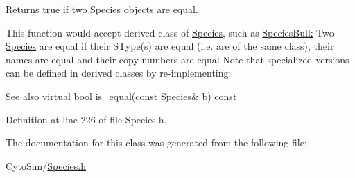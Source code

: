Returns true if two \hyperlink{classchem_1_1Species}{Species} objects are equal. 

This function would accept derived class of \hyperlink{classchem_1_1Species}{Species}, such as \hyperlink{classchem_1_1SpeciesBulk}{Species\-Bulk} Two \hyperlink{classchem_1_1Species}{Species} are equal if their S\-Type(s) are equal (i.\-e. are of the same class), their names are equal and their copy numbers are equal Note that specialized versions can be defined in derived classes by re-\/implementing\-: \begin{DoxySeeAlso}{See also}
virtual bool \hyperlink{classchem_1_1Species_ac01be786c36974eb1e288b1bfdbf02f2}{is\-\_\-equal(const Species\& b) const } 
\end{DoxySeeAlso}


Definition at line 226 of file Species.\-h.



The documentation for this class was generated from the following file\-:\begin{DoxyCompactItemize}
\item 
Cyto\-Sim/\hyperlink{Species_8h}{Species.\-h}\end{DoxyCompactItemize}
